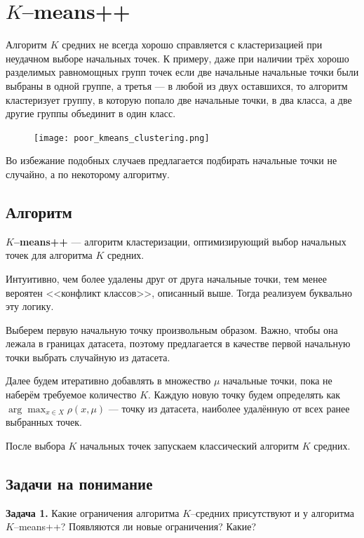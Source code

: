 \section{$K$--means++}

Алгоритм $K$ средних не всегда хорошо справляется с кластеризацией при неудачном выборе начальных точек.
К примеру, даже при наличии трёх хорошо разделимых равномощных групп точек если две начальные начальные точки были выбраны в одной группе,
а третья --- в любой из двух оставшихся, то алгоритм кластеризует группу, в которую попало две начальные точки, в два класса, а две другие группы объединит в один класс.

\begin{figure}[H]
    \centering
    \texttt{[image: poor\_kmeans\_clustering.png]}
\end{figure}

Во избежание подобных случаев предлагается подбирать начальные точки не случайно, а по некоторому алгоритму.

\subsection{Алгоритм}

\textbf{$K$--means++} --- алгоритм кластеризации, оптимизирующий выбор начальных точек для алгоритма $K$ средних.

Интуитивно, чем более удалены друг от друга начальные точки, тем менее вероятен <<конфликт классов>>, описанный выше. Тогда реализуем буквально эту логику.

Выберем первую начальную точку произвольным образом. Важно, чтобы она лежала в границах датасета, поэтому предлагается
в качестве первой начальную точки выбрать случайную из датасета.

Далее будем итеративно добавлять в множество $\mu$ начальные точки, пока не наберём требуемое количество $K$.
Каждую новую точку будем определять как $\arg\max_{x\in X} \rho(x, \mu)$ --- точку из датасета, наиболее удалённую от всех ранее выбранных точек.

После выбора $K$ начальных точек запускаем классический алгоритм $K$ средних.

\subsection{Задачи на понимание}

\textbf{Задача 1.} Какие ограничения алгоритма $K$--средних присутствуют и у алгоритма $K$--means++? Появляются ли новые ограничения? Какие?

